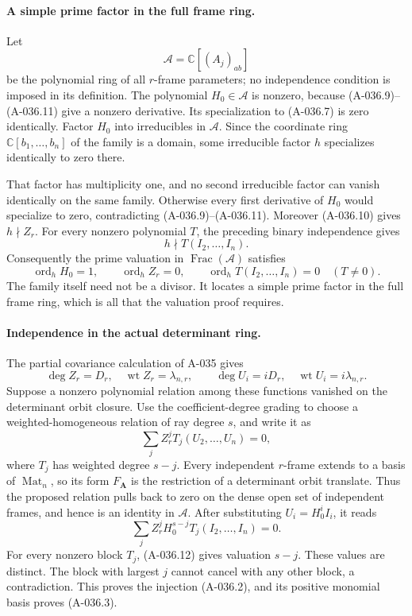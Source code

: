 \paragraph{A simple prime factor in the full frame ring.}
Let
\[
                     \mathcal A=\mathbb C[(A_j)_{ab}]
 \]
be the polynomial ring of all \(r\)-frame parameters;
no independence condition is imposed in its definition.
The polynomial \(H_0\in\mathcal A\) is nonzero,
because (A-036.9)--(A-036.11) give a nonzero derivative.
Its specialization to (A-036.7) is zero identically.
Factor \(H_0\) into irreducibles in \(\mathcal A\).
Since the coordinate ring \(\mathbb C[b_1,\ldots,b_n]\)
of the family is a domain, some irreducible factor
\(h\) specializes identically to zero there.

That factor has multiplicity one, and no second
irreducible factor can vanish identically on the
same family. Otherwise every first derivative
of \(H_0\) would specialize to zero, contradicting
(A-036.9)--(A-036.11).
Moreover (A-036.10) gives \(h\nmid Z_r\).
For every nonzero polynomial \(T\), the preceding
binary independence gives
\[
                     h\nmid T(I_2,\ldots,I_n).
 \]
Consequently the prime valuation in
\(\operatorname{Frac}(\mathcal A)\) satisfies
\[
 \operatorname{ord}_h H_0=1,\qquad
 \operatorname{ord}_h Z_r=0,\qquad
 \operatorname{ord}_h T(I_2,\ldots,I_n)=0\quad(T\ne0).
                                                               \tag{A-036.12}
\]
The family itself need not be a divisor.
It locates a simple prime factor in the full frame ring,
which is all that the valuation proof requires.

\paragraph{Independence in the actual determinant ring.}
The partial covariance calculation of A-035 gives
\[
 \deg Z_r=D_r,\quad \operatorname{wt}Z_r=\lambda_{n,r},
 \qquad
 \deg U_i=iD_r,\quad \operatorname{wt}U_i=i\lambda_{n,r}.
 \]
Suppose a nonzero polynomial relation among these
functions vanished on the determinant orbit closure.
Use the coefficient-degree grading to choose a
weighted-homogeneous relation of ray degree \(s\),
and write it as
\[
                       \sum_j Z_r^j T_j(U_2,\ldots,U_n)=0,
 \]
where \(T_j\) has weighted degree \(s-j\).
Every independent \(r\)-frame extends to a basis of
\(\operatorname{Mat}_n\), so its form \(F_{\mathbf A}\)
is the restriction of a determinant orbit translate.
Thus the proposed relation pulls back to zero on
the dense open set of independent frames, and hence
is an identity in \(\mathcal A\).
After substituting \(U_i=H_0^i I_i\), it reads
\[
                     \sum_j Z_r^j H_0^{s-j}T_j(I_2,\ldots,I_n)=0.
 \]
For every nonzero block \(T_j\), (A-036.12) gives
valuation \(s-j\). These values are distinct.
The block with largest \(j\) cannot cancel with
any other block, a contradiction.
This proves the injection (A-036.2), and its
positive monomial basis proves (A-036.3).

